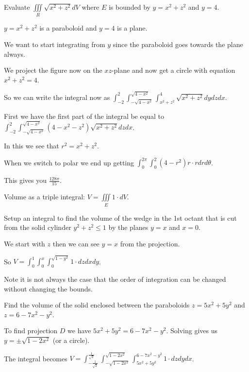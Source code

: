 \documentclass[../calc3.tex]{subfiles}
\begin{document}
\begin{example}
    Evaluate $\iiint\limits_{R} \sqrt{x^2+z^2}dV$ where $E$ is bounded by $y=x^2+z^2$ and $y=4$.

    $y=x^2+z^2$ is a paraboloid and $y=4$ is a plane.

    We want to start integrating from $y$ since the paraboloid goes towards the plane always.

    We project the figure now on the $xz$-plane and now get a circle with equation $x^2+z^2=4$.

    So we can write the integral now as $\int_{-2}^2 \int_{-\sqrt{4-x^2}}^{\sqrt{4-x^2}} \int_{x^2+z^2}^4 \sqrt{x^2+z^2}dy dz dx$.

    First we have the first part of the integral be equal to $\int_{-2}^2 \int_{-\sqrt{4-x^2}}^{\sqrt{4-x^2}} (4-x^2-z^2)\sqrt{x^2+z^2}dzdx$.

    In this we see that $r^2=x^2+z^2$.

    When we switch to polar we end up getting $\int_{0}^{2\pi} \int_{0}^{2} (4-r^2)r\cdot r dr d\theta$.

    This gives you $\frac{128\pi}{15}$.
\end{example}

Volume as a triple integral: $V=\iiint\limits_{E} 1\cdot dV$.

\begin{example}
    Setup an integral to find the volume of the wedge in the 1st octant that is cut from the solid cylinder $y^2+z^2\leq 1$ by the planes $y=x$ and $x=0$.

    We start with $z$ then we can see $y=x$ from the projection.

    So $V=\int_0^1 \int_0^x \int_0^{\sqrt{1-y^2}}1\cdot dz dx dy$.
\end{example}

Note it is not always the case that the order of integration can be changed without changing the bounds.

\begin{example}
    Find the volume of the solid enclosed between the paraboloids $z=5x^2+5y^2$ and $z=6-7x^2-y^2$.

    To find projection $D$ we have $5x^2+5y^2=6-7x^2-y^2$. Solving gives us $y=\pm \sqrt{1-2x^2}$ (or a circle).

    The integral becomes $V=\int_{-\frac{1}{\sqrt{2}}}^{\frac{1}{\sqrt{2}}}\int_{-\sqrt{1-2x^2}}^{\sqrt{1-2x^2}}\int_{5x^2+5y^2}^{6-7x^2-y^2}1\cdot dz dy dx$.
\end{example}
\end{document}
